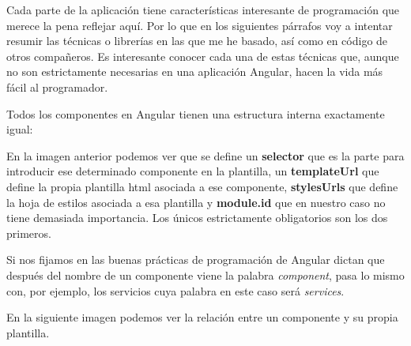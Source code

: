 Cada parte de la aplicación tiene características interesante de programación que merece la pena reflejar aquí. Por lo que en los siguientes párrafos voy a intentar resumir las técnicas o librerías en las que me he basado, así como en código de otros compañeros. Es interesante conocer cada una de estas técnicas que, aunque no son estrictamente necesarias en una aplicación Angular, hacen la vida más fácil al programador. 


Todos los componentes en Angular tienen una estructura interna exactamente igual:


En la imagen anterior podemos ver que se define un \textbf{selector} que es la parte para introducir ese determinado componente en la plantilla, un \textbf{templateUrl} que define la propia plantilla html asociada a ese componente, \textbf{stylesUrls} que define la hoja de estilos asociada a esa plantilla y \textbf{module.id} que en nuestro caso no tiene demasiada importancia.  Los únicos estrictamente obligatorios son los dos primeros.

Si nos fijamos en las buenas prácticas de programación de Angular dictan que después del nombre de un componente viene la palabra \emph{component}, pasa lo mismo con, por ejemplo, los servicios cuya palabra en este caso será \emph{services}.

En la siguiente imagen podemos ver la relación entre un componente y su propia plantilla.







